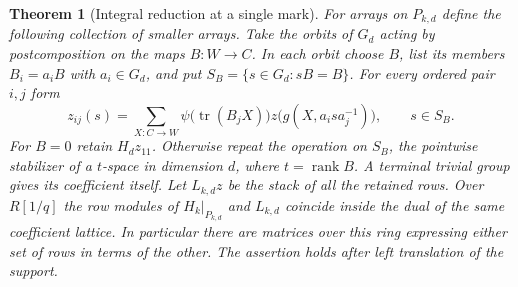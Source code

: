 \documentclass[a4paper,11pt]{article}
\newtheorem{theorem}[proposition]{Theorem}
\theoremstyle{definition}
\theoremstyle{remark}
\numberwithin{equation}{section}
\begin{document}
\begin{theorem}[Integral reduction at a single mark]
\leavevmode\label{thm:integralrestrictions627}
For arrays on \(P_{k,d}\) define the following collection of
smaller arrays. Take the orbits of \(G_d\) acting by
postcomposition on the maps \(B:W\to C\). In each orbit choose
\(B\), list its members \(B_i=a_iB\) with \(a_i\in G_d\), and
put \(S_B=\{s\in G_d:sB=B\}\). For every ordered pair \(i,j\) form
\[
   z_{ij}(s)=\sum_{X:C\to W}
      \psi\bigl(\operatorname{tr}(B_jX)\bigr)
      z\bigl(g(X,a_i s a_j^{-1})\bigr),\qquad s\in S_B .
\]
For \(B=0\) retain \(H_d z_{11}\). Otherwise repeat the operation
on \(S_B\), the pointwise stabilizer of a \(t\)-space in dimension
\(d\), where \(t=\operatorname{rank} B\). A terminal trivial
group gives its coefficient itself. Let \(L_{k,d}z\) be the stack
of all the retained rows. Over \(R[1/q]\) the row modules of
\(H_k|_{P_{k,d}}\) and \(L_{k,d}\) coincide inside the dual of
the same coefficient lattice. In particular there are matrices
over this ring expressing either set of rows in terms of the other.
The assertion holds after left translation of the support.
\end{theorem}
\end{document}
